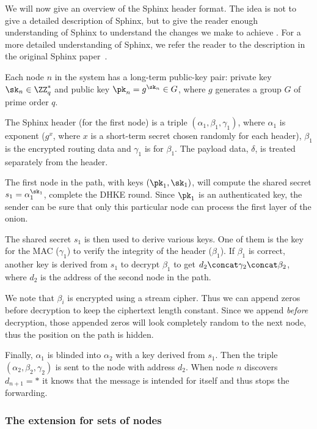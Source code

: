 We will now give an overview of the Sphinx header format.
The idea is not to give a detailed description of Sphinx, but to give the 
reader enough understanding of Sphinx to understand the changes we make to 
achieve \Sphinxes.
For a more detailed understanding of Sphinx, we refer the reader to the 
description in the original Sphinx paper~\cite{Sphinx}.

Each node \(n\) in the system has a long-term public-key pair: private key 
\(\sk_n\in \ZZ_q^*\) and public key \(\pk_n = g^{\sk_n}\in G\), where \(g\) 
generates a group \(G\) of prime order \(q\).

The Sphinx header (for the first node) is a triple \((\alpha_1, \beta_1, 
  \gamma_1)\), where \(\alpha_1\) is  exponent (\(g^x\), where \(x\) 
is a short-term secret chosen randomly for each header), \(\beta_1\) is the 
encrypted routing data and \(\gamma_1\) is  for \(\beta_1\).
The payload data, \(\delta\), is treated separately from the header.

The first node in the path, with keys \((\pk_1, \sk_1)\), will compute the 
shared secret \(s_1 = \alpha_1^{\sk_1}\), \ie complete the \ac{DHKE} round.
Since \(\pk_1\) is an authenticated key, the sender can be sure that only this 
particular node can process the first layer of the onion.

The shared secret \(s_1\) is then used to derive various keys.
One of them is the key for the \ac{MAC} (\(\gamma_1\)) to verify the integrity 
of the header (\(\beta_1\)).
If \(\beta_1\) is correct, another key is derived from \(s_1\) to decrypt 
\(\beta_1\) to get \(d_2\concat \gamma_2\concat \beta_2\), where \(d_2\) is the 
address of the second node in the path.

We note that \(\beta_i\) is encrypted using a stream cipher.
Thus we can append zeros before decryption to keep the ciphertext length 
constant.
Since we append \emph{before} decryption, those appended zeros will look 
completely random to the next node, thus the position on the path is hidden.

Finally, \(\alpha_1\) is blinded into \(\alpha_2\) with a key derived from 
\(s_1\).
Then the triple \((\alpha_2, \beta_2, \gamma_2)\) is sent to the node with 
address \(d_2\). When node \(n\) discovers \(d_{n+1} = *\) it knows that the message is intended 
for itself and thus stops the forwarding.

\subsubsection{The \Sphinxes extension for sets of nodes}


